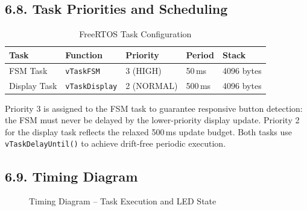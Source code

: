 \documentclass[12pt]{article}
\begin{document}
\subsection*{6.8. Task Priorities and Scheduling}

\begin{table}[H]
    \centering
    \caption{FreeRTOS Task Configuration}
    \label{tab:task-config}
    \begin{tabular}{|l|l|l|l|l|}
        \hline
        \textbf{Task} & \textbf{Function} & \textbf{Priority} & \textbf{Period} & \textbf{Stack} \\
        \hline
        FSM Task & \texttt{vTaskFSM} & 3 (HIGH) & 50\,ms & 4096 bytes \\
        \hline
        Display Task & \texttt{vTaskDisplay} & 2 (NORMAL) & 500\,ms & 4096 bytes \\
        \hline
    \end{tabular}
\end{table}

Priority 3 is assigned to the FSM task to guarantee responsive button detection: the FSM must never be delayed by the lower-priority display update. Priority 2 for the display task reflects the relaxed 500\,ms update budget. Both tasks use \texttt{vTaskDelayUntil()} to achieve drift-free periodic execution.

\subsection*{6.9. Timing Diagram}

\begin{figure}[H]
    \centering
    \caption{Timing Diagram – Task Execution and LED State}
    \label{fig:timing}
\end{figure}
\end{document}
